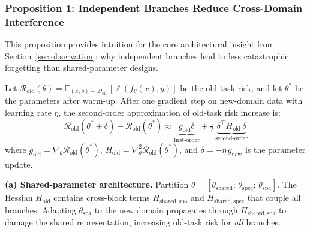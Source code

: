 \subsubsection{Proposition 1: Independent Branches Reduce Cross-Domain Interference}
\label{app:interference}

This proposition provides intuition for the core architectural insight from Section~\ref{sec:observation}: why independent branches lead to less catastrophic forgetting than shared-parameter designs.

\begin{proposition}
\label{prop:interference}
Let $\mathcal{R}_{\mathrm{old}}(\theta) = \mathbb{E}_{(x,y) \sim \mathcal{D}_{\mathrm{old}}}[\ell(f_\theta(x), y)]$ be the old-task risk, and let $\theta^*$ be the parameters after warm-up.
After one gradient step on new-domain data with learning rate $\eta$, the second-order approximation of old-task risk increase is:
\begin{equation}
    \mathcal{R}_{\mathrm{old}}(\theta^* + \delta) - \mathcal{R}_{\mathrm{old}}(\theta^*) \approx \underbrace{g_{\mathrm{old}}^\top \delta}_{\text{first-order}} + \tfrac{1}{2}\,\underbrace{\delta^\top H_{\mathrm{old}}\, \delta}_{\text{second-order}}
\label{eq:risk_increase}
\end{equation}
where $g_{\mathrm{old}} = \nabla_\theta \mathcal{R}_{\mathrm{old}}(\theta^*)$, $H_{\mathrm{old}} = \nabla^2_\theta \mathcal{R}_{\mathrm{old}}(\theta^*)$, and $\delta = -\eta\, g_{\mathrm{new}}$ is the parameter update.

\textbf{(a) Shared-parameter architecture.}
Partition $\theta = [\theta_{\mathrm{shared}};\, \theta_{\mathrm{spec}};\, \theta_{\mathrm{spa}}]$. The Hessian $H_{\mathrm{old}}$ contains cross-block terms $H_{\mathrm{shared,spa}}$ and $H_{\mathrm{shared,spec}}$ that couple all branches.
Adapting $\theta_{\mathrm{spa}}$ to the new domain propagates through $H_{\mathrm{shared,spa}}$ to damage the shared representation, increasing old-task risk for \emph{all} branches.


\end{proposition}
